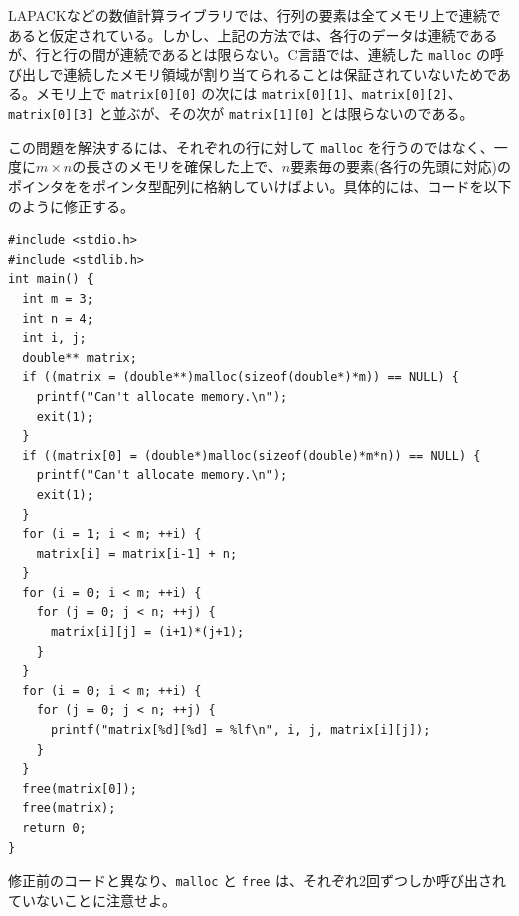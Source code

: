 LAPACKなどの数値計算ライブラリでは、行列の要素は全てメモリ上で連続であると仮定されている。しかし、上記の方法では、各行のデータは連続であるが、行と行の間が連続であるとは限らない。C言語では、連続した \verb|malloc| の呼び出しで連続したメモリ領域が割り当てられることは保証されていないためである。メモリ上で \verb|matrix[0][0]| の次には \verb|matrix[0][1]|、\verb|matrix[0][2]|、\verb|matrix[0][3]| と並ぶが、その次が \verb|matrix[1][0]| とは限らないのである。

この問題を解決するには、それぞれの行に対して \verb|malloc| を行うのではなく、一度に$m \times n$の長さのメモリを確保した上で、$n$要素毎の要素(各行の先頭に対応)のポインタををポインタ型配列に格納していけばよい。具体的には、コードを以下のように修正する。
\begin{reidai}\label{ex:malloc-2dim-continuous}
\begin{verbatim}
#include <stdio.h>
#include <stdlib.h>
int main() {
  int m = 3;
  int n = 4;
  int i, j;
  double** matrix;
  if ((matrix = (double**)malloc(sizeof(double*)*m)) == NULL) {
    printf("Can't allocate memory.\n");
    exit(1);
  }
  if ((matrix[0] = (double*)malloc(sizeof(double)*m*n)) == NULL) {
    printf("Can't allocate memory.\n");
    exit(1);
  }
  for (i = 1; i < m; ++i) {
    matrix[i] = matrix[i-1] + n;
  }
  for (i = 0; i < m; ++i) {
    for (j = 0; j < n; ++j) {
      matrix[i][j] = (i+1)*(j+1);
    }
  }
  for (i = 0; i < m; ++i) {
    for (j = 0; j < n; ++j) {
      printf("matrix[%d][%d] = %lf\n", i, j, matrix[i][j]);
    }
  }
  free(matrix[0]);
  free(matrix);
  return 0;
}
\end{verbatim}
\end{reidai} \noindent
修正前のコードと異なり、\verb|malloc| と \verb|free| は、それぞれ2回ずつしか呼び出されていないことに注意せよ。

